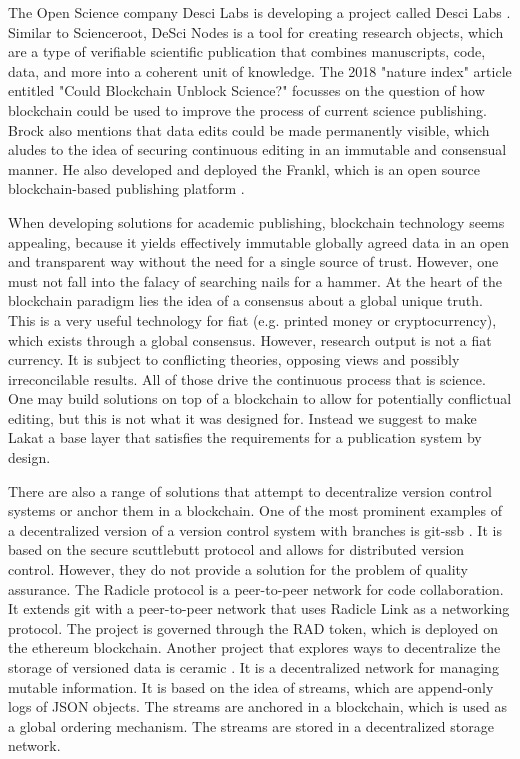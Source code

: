 The Open Science company Desci Labs is developing a project called Desci Labs \cite{descilabs}. Similar to Scienceroot, DeSci Nodes is a tool for creating research objects, which are a type of verifiable scientific publication that combines manuscripts, code, data, and more into a coherent unit of knowledge.  
The 2018 "nature index" article \cite{brock2018} entitled "Could Blockchain Unblock Science?" focusses on the question of how blockchain could be used to improve the process of current science publishing. Brock also mentions that data edits could be made permanently visible, which aludes to the idea of securing continuous editing in an immutable and consensual manner. He also developed and deployed the Frankl, which is an open source blockchain-based publishing platform \cite{brockopenscience2018}. 

When developing solutions for academic publishing, blockchain technology seems appealing, because it yields effectively immutable globally agreed data in an open and transparent way without the need for a single source of trust. However, one must not fall into the falacy of searching nails for a hammer. At the heart of the blockchain paradigm lies the idea of a consensus about a global unique truth. This is a very useful technology for fiat (e.g. printed money or cryptocurrency), which exists through a global consensus. However, research output is not a fiat currency. It is subject to conflicting theories, opposing views and possibly irreconcilable results. All of those drive the continuous process that is science. One may build solutions on top of a blockchain to allow for potentially conflictual editing, but this is not what it was designed for. Instead we suggest to make Lakat a base layer that satisfies the requirements for a publication system by design.
   
There are also a range of solutions that attempt to decentralize version control systems or anchor them in a blockchain. One of the most prominent examples of a decentralized version of a version control system with branches is git-ssb \cite{gitssb}. It is based on the secure scuttlebutt protocol \cite{scuttlebutt} and allows for distributed version control. However, they do not provide a solution for the problem of quality assurance.
The Radicle protocol \cite{radicle} is a peer-to-peer network for code collaboration. It extends git with a peer-to-peer network that uses Radicle Link as a networking protocol. The project is governed through the RAD token, which is deployed on the ethereum blockchain. Another project that explores ways to decentralize the storage of versioned data is ceramic \cite{ceramic}. It is a decentralized network for managing mutable information. It is based on the idea of streams, which are append-only logs of JSON objects. The streams are anchored in a blockchain, which is used as a global ordering mechanism. The streams are stored in a decentralized storage network.  


